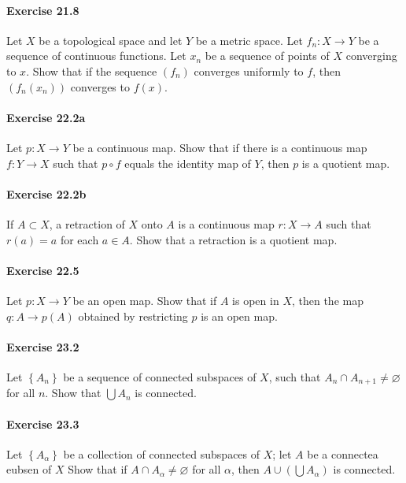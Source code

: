 \documentclass{article}
\begin{document}
\paragraph{Exercise 21.8} Let $X$ be a topological space and let $Y$ be a metric space. Let $f_{n}: X \rightarrow Y$ be a sequence of continuous functions. Let $x_{n}$ be a sequence of points of $X$ converging to $x$. Show that if the sequence $\left(f_{n}\right)$ converges uniformly to $f$, then $\left(f_{n}\left(x_{n}\right)\right)$ converges to $f(x)$.

\paragraph{Exercise 22.2a} Let $p: X \rightarrow Y$ be a continuous map. Show that if there is a continuous map $f: Y \rightarrow X$ such that $p \circ f$ equals the identity map of $Y$, then $p$ is a quotient map.


\paragraph{Exercise 22.2b} If $A \subset X$, a retraction of $X$ onto $A$ is a continuous map $r: X \rightarrow A$ such that $r(a)=a$ for each $a \in A$. Show that a retraction is a quotient map.

\paragraph{Exercise 22.5} Let $p \colon X \rightarrow Y$ be an open map. Show that if $A$ is open in $X$, then the map $q \colon A \rightarrow p(A)$ obtained by restricting $p$ is an open map.

\paragraph{Exercise 23.2} Let $\left\{A_{n}\right\}$ be a sequence of connected subspaces of $X$, such that $A_{n} \cap A_{n+1} \neq \varnothing$ for all $n$. Show that $\bigcup A_{n}$ is connected.

\paragraph{Exercise 23.3} Let $\left\{A_{\alpha}\right\}$ be a collection of connected subspaces of $X$; let $A$ be a connectea eubsen of $X$ Show that if $A \cap A_{\alpha} \neq \varnothing$ for all $\alpha$, then $A \cup\left(\bigcup A_{\alpha}\right)$ is connected.
\end{document}
